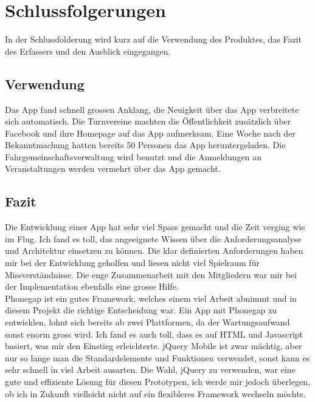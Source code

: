 %
%

\chapter{Schlussfolgerungen}\label{chap.Schlussfolgerungen}
In der Schlussfolderung wird kurz auf die Verwendung des Produktes, das Fazit des Erfassers und den Ausblick eingegangen.

\section{Verwendung}\label{fazit_verwendung}
Das App fand schnell grossen Anklang, die Neuigkeit über das App verbreitete sich automatisch. Die Turnvereine machten die Öffentlichkeit zusätzlich über Facebook und ihre Homepage auf das App aufmerksam. Eine Woche nach der Bekanntmachung hatten bereits 50 Personen das App heruntergeladen. Die Fahrgemeinschaftsverwaltung wird benutzt und die Anmeldungen an Veranstaltungen werden vermehrt über das App gemacht.

\section{Fazit}\label{fazit}

Die Entwicklung einer App hat sehr viel Spass gemacht und die Zeit verging wie im Flug. Ich fand es toll, das angeeignete Wissen über die Anforderungsanalyse und Architektur einsetzen zu können. Die klar definierten Anforderungen haben mir bei der Entwicklung geholfen und liesen nicht viel Spielraum für Missverständnisse. Die enge Zusammenarbeit mit den Mitgliedern war mir bei der Implementation ebenfalls eine grosse Hilfe.\\

Phonegap ist ein gutes Framework, welches einem viel Arbeit abnimmt und in diesem Projekt die richtige Entscheidung war. Ein App mit Phonegap zu entwicklen, lohnt sich bereits ab zwei Plattformen, da der Wartungsaufwand sonst enorm gross wird. Ich fand es auch toll, dass es auf HTML und Javascript basiert, was mir den Einstieg erleichterte. jQuery Mobile ist zwar mächtig, aber nur so lange man die Standardelemente und Funktionen verwendet, sonst kann es sehr schnell in viel Arbeit ausarten. Die Wahl, jQuery zu verwenden, war eine gute und effiziente Lösung für diesen Prototypen, ich werde mir jedoch überlegen, ob ich in Zukunft vielleicht nicht auf ein flexibleres Framework wechseln möchte.\\

